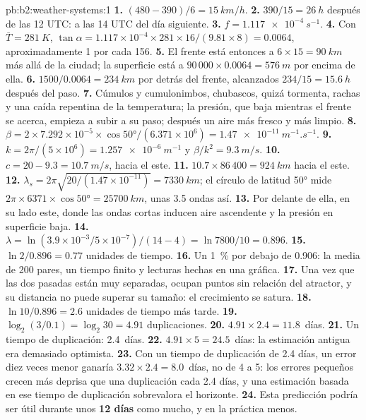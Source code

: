 \begin{solution}{pb:b2:weather-systems:1}
\textbf{1.} $(480 - 390)/6 = \qty{15}{km/h}$.
\textbf{2.} $390/15 = \qty{26}{h}$ después de las 12 UTC: a las 14 UTC del día siguiente.
\textbf{3.} $f = \qty{1.117e-4}{s^{-1}}$.
\textbf{4.} Con $\bar T = \qty{281}{K}$, $\tan\alpha = 1.117 \times 10^{-4} \times 281 \times
16/(9.81 \times 8) = 0.0064$, aproximadamente 1 por cada 156.
\textbf{5.} El frente está entonces a $6 \times 15 = \qty{90}{km}$ más allá de la ciudad; la superficie está
a $90\,000 \times 0.0064 = \qty{576}{m}$ por encima de ella.
\textbf{6.} $1500/0.0064 = \qty{234}{km}$ por detrás del frente, alcanzados $234/15 = \qty{15.6}{h}$ después
del paso.
\textbf{7.} Cúmulos y cumulonimbos, chubascos, quizá tormenta, rachas y una caída repentina de la
temperatura; la presión, que baja mientras el frente se acerca, empieza a subir a su paso; después
un aire más fresco y más limpio.
\textbf{8.} $\beta = 2 \times 7.292 \times 10^{-5} \times \cos\ang{50}/(6.371 \times 10^6) =
\qty{1.47e-11}{m^{-1}.s^{-1}}$.
\textbf{9.} $k = 2\pi/(5 \times 10^6) = \qty{1.257e-6}{m^{-1}}$ y $\beta/k^2 = \qty{9.3}{m/s}$.
\textbf{10.} $c = 20 - 9.3 = \qty{10.7}{m/s}$, hacia el este.
\textbf{11.} $10.7 \times 86\,400 = \qty{924}{km}$ hacia el este.
\textbf{12.} $\lambda_s = 2\pi\sqrt{20/(1.47 \times 10^{-11})} = \qty{7330}{km}$; el círculo de
latitud \ang{50} mide $2\pi \times 6371 \times \cos\ang{50} = \qty{25700}{km}$, unas 3.5
ondas así.
\textbf{13.} Por delante de ella, en su lado este, donde las ondas cortas inducen aire ascendente y la
presión en superficie baja.
\textbf{14.} $\lambda = \ln(3.9 \times 10^{-3}/5 \times 10^{-7})/(14 - 4) = \ln 7800/10 = 0.896$.
\textbf{15.} $\ln 2/0.896 = 0.77$ unidades de tiempo.
\textbf{16.} Un \qty{1}{\percent} por debajo de 0.906: la media de 200 pares, un tiempo finito y lecturas hechas en
una gráfica.
\textbf{17.} Una vez que las dos pasadas están muy separadas, ocupan puntos sin relación del atractor, y
su distancia no puede superar su tamaño: el crecimiento se satura.
\textbf{18.} $\ln 10/0.896 = 2.6$ unidades de tiempo más tarde.
\textbf{19.} $\log_2(3/0.1) = \log_2 30 = 4.91$ duplicaciones.
\textbf{20.} $4.91 \times 2.4 = 11.8$~días.
\textbf{21.} Un tiempo de duplicación: 2.4~días.
\textbf{22.} $4.91 \times 5 = 24.5$~días: la estimación antigua era demasiado optimista.
\textbf{23.} Con un tiempo de duplicación de 2.4 días, un error diez veces menor ganaría $3.32 \times 2.4
= 8.0$~días, no de 4 a 5: los errores pequeños crecen más deprisa que una duplicación cada 2.4 días, y una
estimación basada en ese tiempo de duplicación sobrevalora el horizonte.
\textbf{24.} Esta predicción podría ser útil durante unos \textbf{12 días} como mucho, y en la práctica
menos.
\end{solution}
